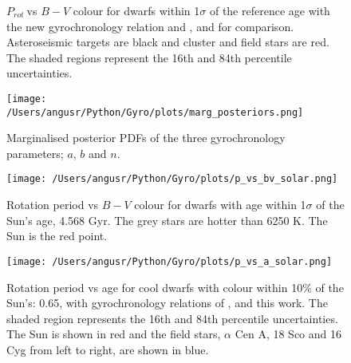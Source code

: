 \documentclass[10pt,preprint]{aastex}
\newcommand{\prot}{$P_{rot}~$}
\begin{document}
\begin{figure}[ht]
\begin{center}
    \end{center}
    \caption{ \prot vs $B-V$ colour for dwarfs within 1$\sigma$ of the reference age with the new gyrochronology relation and \citet{Barnes2007}, and \citet{Mamajek2008} for comparison. Asteroseismic targets are black and cluster and field stars are red. The shaded regions represent the 16th and 84th percentile uncertainties.
     }
   \label{fig:subfigures2}
\end{figure}

\begin{figure}[ht]
\begin{center}
\texttt{[image: /Users/angusr/Python/Gyro/plots/marg\_posteriors.png]}
\caption{Marginalised posterior PDFs of the three gyrochronology parameters; $a$, $b$ and $n$.}
\label{fig:marg_posteriors}
\end{center}
\end{figure}

\begin{figure}[ht]
\begin{center}
\texttt{[image: /Users/angusr/Python/Gyro/plots/p\_vs\_bv\_solar.png]}
\caption{Rotation period vs $B-V$ colour for dwarfs with age within 1$\sigma$ of the Sun's age, 4.568 Gyr. The grey stars are hotter than 6250 K. The Sun is the red point.}
\label{fig:p_vs_bv_solar}
\end{center}
\end{figure}

\begin{figure}[ht]
\begin{center}
\texttt{[image: /Users/angusr/Python/Gyro/plots/p\_vs\_a\_solar.png]}
\caption{Rotation period vs age for cool dwarfs with colour within 10\% of the Sun's: 0.65, with gyrochronology relations of \citet{Barnes2007}, \citet{Mamajek2008} and this work. The shaded region represents the 16th and 84th percentile uncertainties. The Sun is shown in red and the field stars, $\alpha$ Cen A, 18 Sco and 16 Cyg from left to right, are shown in blue.}
\label{fig:p_vs_a_solar}
\end{center}
\end{figure}
\end{document}
